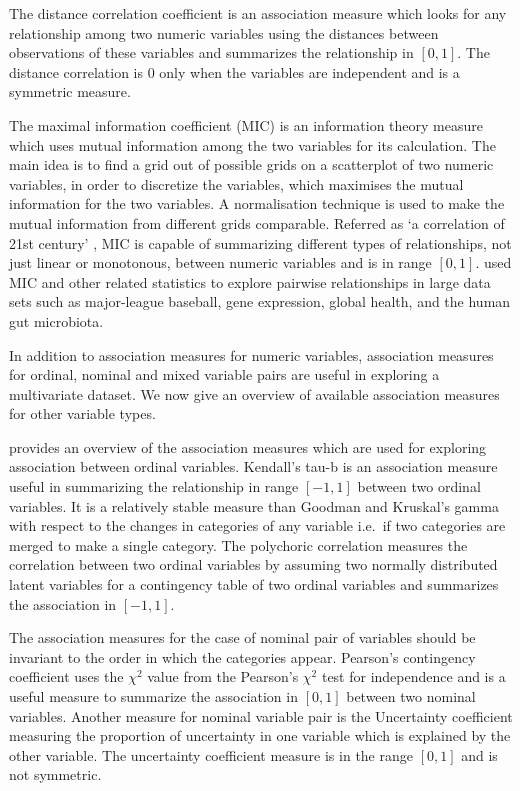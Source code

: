 The distance correlation coefficient \citep{szekely2007measuring} is an
association measure which looks for any relationship among two numeric
variables using the distances between observations of these variables
and summarizes the relationship in \([0,1]\). The distance correlation
is \(0\) only when the variables are independent and is a symmetric
measure.

The maximal information coefficient (MIC) \citep{reshef2011detecting} is
an information theory measure which uses mutual information among the
two variables for its calculation. The main idea is to find a grid out
of possible grids on a scatterplot of two numeric variables, in order to
discretize the variables, which maximises the mutual information for the
two variables. A normalisation technique is used to make the mutual
information from different grids comparable. Referred as `a correlation
of 21st century' \citep{speed2011correlation}, MIC is capable of
summarizing different types of relationships, not just linear or
monotonous, between numeric variables and is in range \([0,1]\).
\citet{reshef2011detecting} used MIC and other related statistics to
explore pairwise relationships in large data sets such as major-league
baseball, gene expression, global health, and the human gut microbiota.

In addition to association measures for numeric variables, association
measures for ordinal, nominal and mixed variable pairs are useful in
exploring a multivariate dataset. We now give an overview of available
association measures for other variable types.

\citet{agresti2010analysis} provides an overview of the association
measures which are used for exploring association between ordinal
variables. Kendall's tau-b \citep{kendall1945treatment} is an
association measure useful in summarizing the relationship in range
\([-1,1]\) between two ordinal variables. It is a relatively stable
measure than Goodman and Kruskal's gamma with respect to the changes in
categories of any variable i.e.~if two categories are merged to make a
single category. The polychoric correlation \citep{olsson1979maximum}
measures the correlation between two ordinal variables by assuming two
normally distributed latent variables for a contingency table of two
ordinal variables and summarizes the association in \([-1,1]\).

The association measures for the case of nominal pair of variables
should be invariant to the order in which the categories appear.
Pearson's contingency coefficient uses the \({\chi}^2\) value from the
Pearson's \({\chi}^2\) test for independence and is a useful measure to
summarize the association in \([0,1]\) between two nominal variables.
Another measure for nominal variable pair is the Uncertainty coefficient
\citep{theil1970estimation} measuring the proportion of uncertainty in
one variable which is explained by the other variable. The uncertainty
coefficient measure is in the range \([0,1]\) and is not symmetric.


